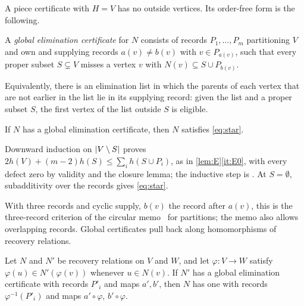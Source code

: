 A piece certificate with $H=V$ has no outside vertices. Its order-free form is the following.

\begin{definition}\label{def:elimcert}
A \emph{global elimination certificate} for $N$ consists of records $P_1,\dots,P_m$ partitioning $V$ and own and
supplying records $a(v)\ne b(v)$ with $v\in P_{a(v)}$, such that every proper subset $S\subsetneq V$ misses a vertex
$v$ with $N(v)\subseteq S\cup P_{b(v)}$.
\end{definition}

Equivalently, there is an elimination list in which the parents of each vertex that are not earlier in the list lie in
its supplying record: given the list and a proper subset $S$, the first vertex of the list outside $S$ is eligible.

\begin{proposition}\label{prop:global}
If $N$ has a global elimination certificate, then $N$ satisfies \eqref{eq:star}.
\end{proposition}

\begin{outline}
Downward induction on $\lvert V\setminus S \rvert$ proves $2h(V)+(m-2)h(S)\le\sum_ih(S\cup P_i)$, as in
\cref{lem:E}\ref{it:E0}, with every defect zero by validity and the closure lemma; the inductive step is
. At $S=\emptyset$, subadditivity over the records gives \eqref{eq:star}.
\end{outline}

With three records and cyclic supply, $b(v)$ the record after $a(v)$, this is the three-record criterion of the
circular memo~\cite[Lemma~2.2]{CircularMemo2026} for partitions; the memo also allows overlapping records. Global
certificates pull back along homomorphisms of recovery relations.

\begin{lemma}\label{lem:pullback}
Let $N$ and $N'$ be recovery relations on $V$ and $W$, and let $\varphi\colon V\to W$ satisfy $\varphi(u)\in
N'(\varphi(v))$ whenever $u\in N(v)$. If $N'$ has a global elimination certificate with records $P'_i$ and maps
$a',b'$, then $N$ has one with records $\varphi^{-1}(P'_i)$ and maps $a'\circ\varphi$, $b'\circ\varphi$.
\end{lemma}

